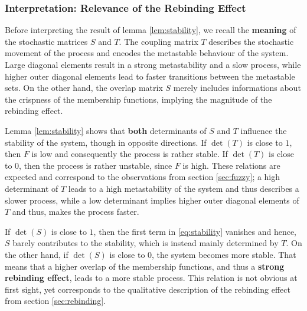 \subsubsection*{Interpretation: Relevance of the Rebinding Effect}

Before interpreting the result of lemma \ref{lem:stability}, we recall the \textbf{meaning} of the stochastic matrices $S$ and $T$.
The coupling matrix $T$ describes the stochastic movement of the process and encodes the metastable behaviour of the system. Large diagonal elements result in a strong metastability and a slow process, while higher outer diagonal elements lead to faster transitions between the metastable sets.
On the other hand, the overlap matrix $S$ merely includes informations about the crispness of the membership functions, implying the magnitude of the rebinding effect.

Lemma \ref{lem:stability} shows that \textbf{both} determinants of $S$ and $T$  influence the stability of the system, though in opposite directions.
If $\det(T)$ is close to $1$, then $F$ is low and consequently the process is rather stable.
If $\det(T)$ is close to $0$, then the process is rather unstable, since $F$ is high.
These relations are expected and correspond to the observations from section \ref{sec:fuzzy}; a high determinant of $T$ leads to a high metastability of the system and thus describes a slower process, while a low determinant implies higher outer diagonal elements of $T$ and thus, makes the process faster.

If $\det(S)$ is close to $1$, then the first term in \eqref{eq:stability} vanishes and hence, $S$ barely contributes to the stability, which is instead mainly determined by $T$.
On the other hand, if $\det(S)$ is close to $0$, the system becomes more stable.
That means that a higher overlap of the membership functions, and thus a \textbf{strong rebinding effect}, leads to a more stable process.
This relation is not obvious at first sight, yet corresponds to the qualitative description of the rebinding effect from section \ref{sec:rebinding}.
\\

